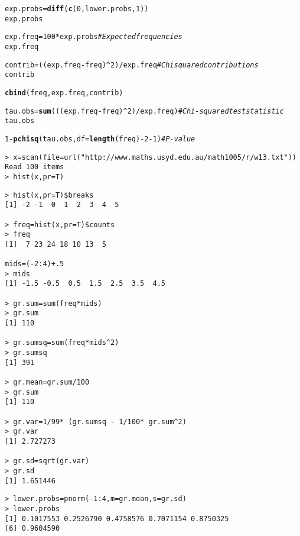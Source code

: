 \documentclass[bigtut]{tutorial}\usepackage[]{graphicx}\usepackage[]{color}
\makeatletter
\newcommand{\hlnum}[1]{\textcolor[rgb]{0.686,0.059,0.569}{#1}}%
\newcommand{\hlcom}[1]{\textcolor[rgb]{0.678,0.584,0.686}{\textit{#1}}}%
\newcommand{\hlopt}[1]{\textcolor[rgb]{0,0,0}{#1}}%
\newcommand{\hlstd}[1]{\textcolor[rgb]{0.345,0.345,0.345}{#1}}%
\newcommand{\hlkwb}[1]{\textcolor[rgb]{0.69,0.353,0.396}{#1}}%
\newcommand{\hlkwc}[1]{\textcolor[rgb]{0.333,0.667,0.333}{#1}}%
\newcommand{\hlkwd}[1]{\textcolor[rgb]{0.737,0.353,0.396}{\textbf{#1}}}%
\newenvironment{kframe}{%
 \def\at@end@of@kframe{}%
 \ifinner\ifhmode%
  \def\at@end@of@kframe{\end{minipage}}%
  \begin{minipage}{\columnwidth}%
 \fi\fi%
 \def\FrameCommand##1{\hskip\@totalleftmargin \hskip-\fboxsep
 \colorbox{shadecolor}{##1}\hskip-\fboxsep
     \hskip-\linewidth \hskip-\@totalleftmargin \hskip\columnwidth}%
 \MakeFramed {\advance\hsize-\width
   \@totalleftmargin\z@ \linewidth\hsize
   \@setminipage}}%
 {\par\unskip\endMakeFramed%
 \at@end@of@kframe}
\newenvironment{knitrout}{}{} %
\makeatother
\begin{document}
\begin{tutorial}
\begin{questions}
\begin{knitrout}
\begin{kframe}
\begin{alltt}
\hlstd{exp.probs}\hlkwb{=}\hlkwd{diff}\hlstd{(}\hlkwd{c}\hlstd{(}\hlnum{0}\hlstd{,lower.probs,}\hlnum{1}\hlstd{))}
\hlstd{exp.probs}

\hlstd{exp.freq}\hlkwb{=} \hlnum{100}\hlopt{*} \hlstd{exp.probs}                        \hlcom{# Expected frequencies  }
\hlstd{exp.freq}

\hlstd{contrib} \hlkwb{=} \hlstd{((exp.freq}\hlopt{-}\hlstd{freq)}\hlopt{^}\hlnum{2}\hlstd{)}\hlopt{/}\hlstd{exp.freq}          \hlcom{# Chi squared contributions}
\hlstd{contrib}

\hlkwd{cbind}\hlstd{(freq,exp.freq,contrib)}

\hlstd{tau.obs}\hlkwb{=}\hlkwd{sum}\hlstd{(((exp.freq}\hlopt{-}\hlstd{freq)}\hlopt{^}\hlnum{2}\hlstd{)}\hlopt{/}\hlstd{exp.freq)}      \hlcom{# Chi-squared test statistic}
\hlstd{tau.obs}

\hlnum{1}\hlopt{-}\hlkwd{pchisq}\hlstd{(tau.obs,} \hlkwc{df}\hlstd{=}\hlkwd{length}\hlstd{(freq)}\hlopt{-}\hlnum{2}\hlopt{-}\hlnum{1}\hlstd{)}         \hlcom{# P-value}
\end{alltt}
\end{kframe}
\end{knitrout}



\begin{solution}
\begin{verbatim}
> x=scan(file=url("http://www.maths.usyd.edu.au/math1005/r/w13.txt"))
Read 100 items
> hist(x,pr=T)
\end{verbatim}


\begin{verbatim}
> hist(x,pr=T)$breaks
[1] -2 -1  0  1  2  3  4  5

> freq=hist(x,pr=T)$counts
> freq
[1]  7 23 24 18 10 13  5

mids=(-2:4)+.5
> mids
[1] -1.5 -0.5  0.5  1.5  2.5  3.5  4.5

> gr.sum=sum(freq*mids)
> gr.sum
[1] 110

> gr.sumsq=sum(freq*mids^2)
> gr.sumsq
[1] 391

> gr.mean=gr.sum/100
> gr.sum
[1] 110

> gr.var=1/99* (gr.sumsq - 1/100* gr.sum^2)
> gr.var
[1] 2.727273

> gr.sd=sqrt(gr.var)
> gr.sd
[1] 1.651446
\end{verbatim}


\begin{verbatim}
> lower.probs=pnorm(-1:4,m=gr.mean,s=gr.sd)
> lower.probs
[1] 0.1017553 0.2526790 0.4758576 0.7071154 0.8750325
[6] 0.9604590


\end{verbatim}
\end{solution}
\end{questions}
\end{tutorial}
\end{document}
